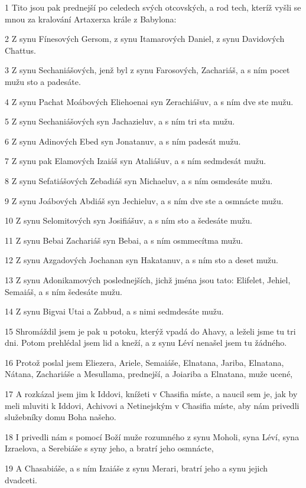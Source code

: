 \par 1 Tito jsou pak prednejší po celedech svých otcovských, a rod tech, kteríž vyšli se mnou za kralování Artaxerxa krále z Babylona:
\par 2 Z synu Fínesových Gersom, z synu Itamarových Daniel, z synu Davidových Chattus.
\par 3 Z synu Sechaniášových, jenž byl z synu Farosových, Zachariáš, a s ním pocet mužu sto a padesáte.
\par 4 Z synu Pachat Moábových Eliehoenai syn Zerachiášuv, a s ním dve ste mužu.
\par 5 Z synu Sechaniášových syn Jachazieluv, a s ním tri sta mužu.
\par 6 Z synu Adinových Ebed syn Jonatanuv, a s ním padesát mužu.
\par 7 Z synu pak Elamových Izaiáš syn Ataliášuv, a s ním sedmdesát mužu.
\par 8 Z synu Sefatiášových Zebadiáš syn Michaeluv, a s ním osmdesáte mužu.
\par 9 Z synu Joábových Abdiáš syn Jechieluv, a s ním dve ste a osmnácte mužu.
\par 10 Z synu Selomitových syn Josifiášuv, a s ním sto a šedesáte mužu.
\par 11 Z synu Bebai Zachariáš syn Bebai, a s ním osmmecítma mužu.
\par 12 Z synu Azgadových Jochanan syn Hakatanuv, a s ním sto a deset mužu.
\par 13 Z synu Adonikamových poslednejších, jichž jména jsou tato: Elifelet, Jehiel, Semaiáš, a s ním šedesáte mužu.
\par 14 Z synu Bigvai Utai a Zabbud, a s nimi sedmdesáte mužu.
\par 15 Shromáždil jsem je pak u potoku, kterýž vpadá do Ahavy, a leželi jsme tu tri dni. Potom prehlédal jsem lid a kneží, a z synu Léví nenašel jsem tu žádného.
\par 16 Protož poslal jsem Eliezera, Ariele, Semaiáše, Elnatana, Jariba, Elnatana, Nátana, Zachariáše a Mesullama, prednejší, a Joiariba a Elnatana, muže ucené,
\par 17 A rozkázal jsem jim k Iddovi, knížeti v Chasifia míste, a naucil sem je, jak by meli mluviti k Iddovi, Achivovi a Netinejským v Chasifia míste, aby nám privedli služebníky domu Boha našeho.
\par 18 I privedli nám s pomocí Boží muže rozumného z synu Moholi, syna Léví, syna Izraelova, a Serebiáše s syny jeho, a bratrí jeho osmnácte,
\par 19 A Chasabiáše, a s ním Izaiáše z synu Merari, bratrí jeho a synu jejich dvadceti.
